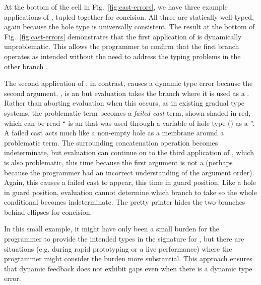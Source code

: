 At the bottom of the cell in Fig.~\ref{fig:cast-errors}, we have three 
example applications of , tupled together for concision. All three are statically
well-typed, again because the hole type is universally consistent. 
The result at the bottom of Fig.~\ref{fig:cast-errors} demonstrates that the first application
of  is dynamically unproblematic. This allows the programmer to confirm that 
the first branch operates as intended without the need to 
address the typing problems in the other branch \cite{Bayne:2011:ASD:1985793.1985864}. 

The second application of , in contrast, causes a dynamic type error because the second argument, , is an  but evaluation takes the branch where it is used as a . 
Rather than aborting evaluation when this occurs, as in existing gradual type systems, the problematic term becomes a \emph{failed cast} term, shown shaded in red, which can be read `` is an  that was used through a variable of hole type () as a ''. 
A failed cast acts much like a non-empty hole as a membrane around a problematic term. The surrounding concatenation operation becomes indeterminate, but  
evaluation can continue on to the third application of , which is also problematic, this time because the first argument is not a  (perhaps because the programmer had an incorrect understanding of the argument order). 
Again, this causes a failed cast to appear, this time in guard position. Like a hole in guard position, evaluation cannot determine which branch to take so the whole conditional becomes indeterminate. 
The pretty printer
hides the two branches behind ellipses for concision.

\ifarxiv

\else
In this small example, it might have only been a small burden for the programmer to provide the intended types in the signature for , but there are situations (e.g. during rapid prototyping or a live performance) where the programmer might consider the burden more substantial. This approach ensures that dynamic feedback does not exhibit gaps even when there is a dynamic type error.
\fi



